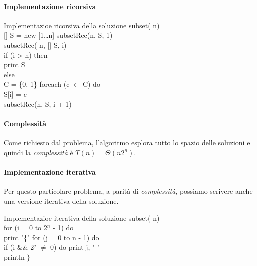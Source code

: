 \paragraph{Implementazione ricorsiva}
\begin{minicode}{Implementazioe ricorsiva della soluzione}
\ind subset( n)\\
    [] S = new [1\dots n]\hfill{}
    subsetRec(n, S, 1)\\

\ind subsetRec( n, [] S,  i)\\
    \indf if (i > n) then\\
        print S\\
    \indf else\\
         C = \{0, 1\}\hfill{}
        \indff foreach (c $\in$ C) do\\
            S[i] = c\\
            subsetRec(n, S, i + 1)
\end{minicode}

\paragraph{Complessità}
Come richiesto dal problema, l'algoritmo esplora tutto lo spazio delle soluzioni
e quindi la \emph{complessità} è $T(n)=\Theta(n2^n)$.

\paragraph{Implementazione iterativa}
Per questo particolare problema, a parità di \emph{complessità}, possiamo
scrivere anche una versione iterativa della soluzione.
\begin{minicode}{Implementazioe iterativa della soluzione}
\ind subset( n)\\
    \indf for (i = 0 to 2$^n$ - 1) do\\
        print "\{"\hfill{}
        \indff for (j = 0 to n - 1) do\\
            \indfff if (i \&\& 2$^j$ $\neq$ 0) do\hfill{}
                print j, " "\\
        \indff println $\}$
\end{minicode}

